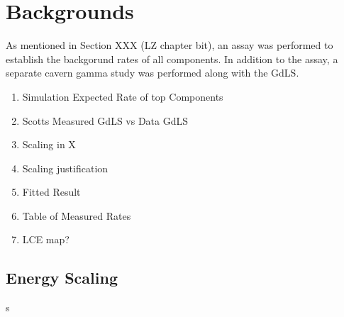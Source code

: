 \section{Backgrounds}
\par
As mentioned in Section XXX (LZ chapter bit), an assay was performed to establish the backgorund rates of all components.
In addition to the assay, a separate cavern gamma study was performed along with the GdLS.

\begin{tcolorbox}[colback=red!5!white, colframe=red!50!black, title=Key Plots]
\begin{enumerate}
    \item Simulation Expected Rate of top Components
    \item Scotts Measured GdLS vs Data GdLS
    \item Scaling in X
    \item Scaling justification
    \item Fitted Result
    \item Table of Measured Rates
    \item LCE map?
\end{enumerate}
\end{tcolorbox}


\subsection{Energy Scaling}
\par
s
